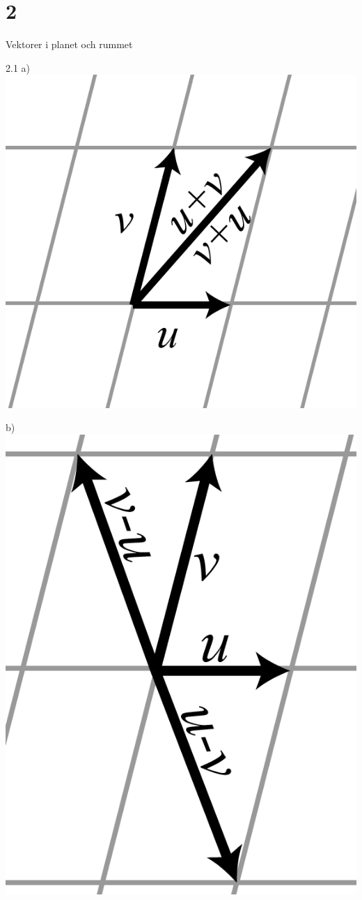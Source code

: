 \chapter{2}{Vektorer i planet och rummet}
\begin{task}{2.1 a)}
	\includegraphics[scale=0.2]{images/21a.PNG}
\end{task}

\begin{task}{b)}
	\includegraphics[scale=0.2]{images/21b.PNG}
\end{task}

